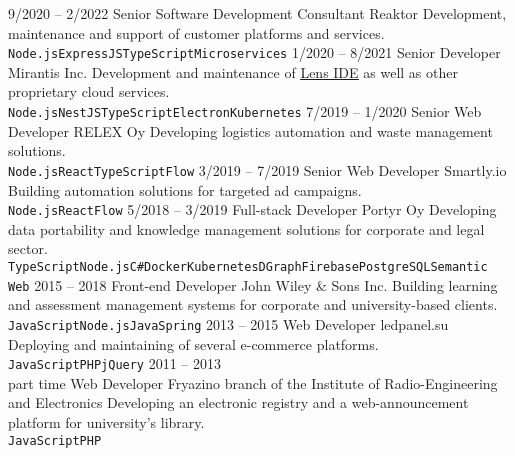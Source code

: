 \documentclass[8pt]{developercv} %
\begin{document}
\begin{entrylist}
	\entry
		{9/2020 -- 2/2022}
		{Senior Software Development Consultant}
		{Reaktor}
		{Development, maintenance and support of customer platforms and services.\\ \texttt{Node.js}\slashsep\texttt{ExpressJS}\slashsep\texttt{TypeScript}\slashsep\texttt{Microservices}}
	\entry
		{1/2020 -- 8/2021}
		{Senior Developer}
		{Mirantis Inc.}
		{Development and maintenance of \href{https://github.com/lensapp/lens}{\underline{Lens IDE}} as well as other proprietary cloud services.\\ \texttt{Node.js}\slashsep\texttt{NestJS}\slashsep\texttt{TypeScript}\slashsep\texttt{Electron}\slashsep\texttt{Kubernetes}}
	\entry
		{7/2019 -- 1/2020}
		{Senior Web Developer}
		{RELEX Oy}
		{Developing logistics automation and waste management solutions.\\ \texttt{Node.js}\slashsep\texttt{React}\slashsep\texttt{TypeScript}\slashsep\texttt{Flow}}
	\entry
		{3/2019 -- 7/2019}
		{Senior Web Developer}
		{Smartly.io}
		{Building automation solutions for targeted ad campaigns.\\ \texttt{Node.js}\slashsep\texttt{React}\slashsep\texttt{Flow}}
	\entry
		{5/2018 -- 3/2019}
		{Full-stack Developer}
		{Portyr Oy}
		{Developing data portability and knowledge management solutions for corporate and legal sector.\\ \texttt{TypeScript}\slashsep\texttt{Node.js}\slashsep\texttt{C\#}\slashsep\texttt{Docker}\slashsep\texttt{Kubernetes}\slashsep\texttt{DGraph}\slashsep\texttt{Firebase}\slashsep\texttt{PostgreSQL}\slashsep\texttt{Semantic Web}}
	\entry
		{2015 -- 2018}
		{Front-end Developer}
		{John Wiley \& Sons Inc.}
		{Building learning and assessment management systems for corporate and university-based clients.\\ \texttt{JavaScript}\slashsep\texttt{Node.js}\slashsep\texttt{Java}\slashsep\texttt{Spring}}
	\entry
		{2013 -- 2015}
		{Web Developer}
		{ledpanel.su}
		{Deploying and maintaining of several e-commerce platforms.\\ \texttt{JavaScript}\slashsep\texttt{PHP}\slashsep\texttt{jQuery}}
	\entry
		{2011 -- 2013\\\footnotesize{part time}}
		{Web Developer}
		{Fryazino branch of the Institute of Radio-Engineering and Electronics}
		{Developing an electronic registry and a web-announcement platform for university's library.\\ \texttt{JavaScript}\slashsep\texttt{PHP}}
\end{entrylist}
\end{document}
